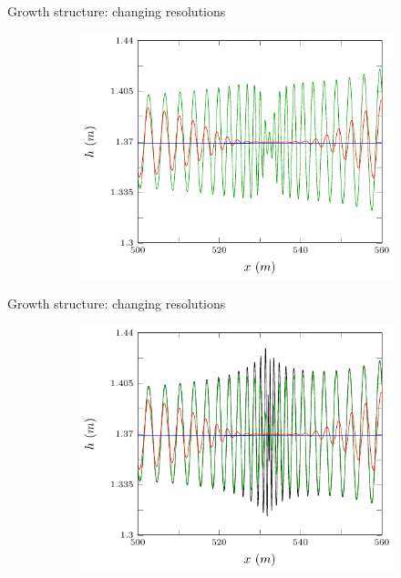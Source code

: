 \documentclass[pdf]{beamer}
\begin{document}
\begin{frame}{Growth structure: changing resolutions}
	\begin{figure}
		\begin{subfigure}{0.75\textwidth}
			\includegraphics[width=\textwidth]{../Pics/dx0/468/2-figure0.pdf}
		\end{subfigure}
	\end{figure}
\end{frame}

\begin{frame}{Growth structure: changing resolutions}
	\begin{figure}
		\begin{subfigure}{0.75\textwidth}
			\includegraphics[width=\textwidth]{../Pics/dx0/all/2-figure0.pdf}
		\end{subfigure}
	\end{figure}
\end{frame}
\end{document}
